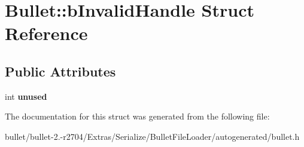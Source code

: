 \hypertarget{struct_bullet_1_1b_invalid_handle}{\section{Bullet\+:\+:b\+Invalid\+Handle Struct Reference}
\label{struct_bullet_1_1b_invalid_handle}
}
\subsection*{Public Attributes}
\begin{DoxyCompactItemize}
\item 
\hypertarget{struct_bullet_1_1b_invalid_handle_a23608fc81270b7e33d11d5fc81d1ad06}{int {\bfseries unused}}\label{struct_bullet_1_1b_invalid_handle_a23608fc81270b7e33d11d5fc81d1ad06}

\end{DoxyCompactItemize}


The documentation for this struct was generated from the following file\+:\begin{DoxyCompactItemize}
\item 
bullet/bullet-\/2.-\/r2704/\+Extras/\+Serialize/\+Bullet\+File\+Loader/autogenerated/bullet.\+h\end{DoxyCompactItemize}

